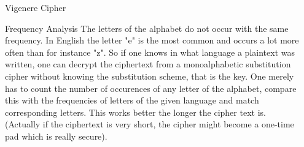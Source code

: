 \documentclass[final,hyperref={pdfpagelabels=false}]{beamer}
\begin{document}
\begin{frame}{}
\begin{columns}[t]
\begin{column}{.3\linewidth}
\begin{block}{Vigenere Cipher}
        \end{block}
        \begin{block}{Frequency Analysis}
          The letters of the alphabet do not occur with the same frequency. In English the letter "e" is the most common and occurs a lot more often than for instance "z". So if one knows in what language a plaintext was written, one can decrypt the ciphertext from a monoalphabetic substitution cipher without knowing the substitution scheme, that is the key. One merely has to count the number of occurences of any letter of the alphabet, compare this with the frequencies of letters of the given language and match corresponding letters. This works better the longer the cipher text is. (Actually if the ciphertext is very short, the cipher might become a one-time pad which is really secure).
        \end{block}
      \end{column}
      \begin{column}{.3\linewidth}


\end{column}
\end{columns}
\end{frame}
\end{document}

